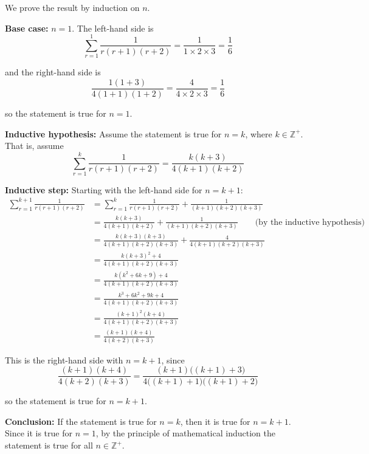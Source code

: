 \documentclass[leqno]{article}
\begin{document}
\begin{enumerate}[
  label=\textbf{\arabic*.},
  leftmargin=*,
  topsep=0pt,
  partopsep=0pt,
  parsep=0pt
]
\vspace*{10pt}

\begin{djsSolution}
We prove the result by induction on $n$.

\textbf{Base case:} $n=1$. The left-hand side is
\[
\sum_{r=1}^{1} \frac{1}{r(r+1)(r+2)}=\frac{1}{1\times 2\times 3}=\frac16
\]

and the right-hand side is
\[
\frac{1(1+3)}{4(1+1)(1+2)}
=\frac{4}{4\times 2\times 3}
=\frac16
\]

so the statement is true for $n=1$.

\textbf{Inductive hypothesis:} Assume the statement is true for $n=k$, where $k\in\mathbb{Z}^+$. That is, assume
\[
\sum_{r=1}^{k} \frac{1}{r(r+1)(r+2)}
=
\frac{k(k+3)}{4(k+1)(k+2)}
\]

\textbf{Inductive step:} Starting with the left-hand side for $n=k+1$:
\begin{align*}
\sum_{r=1}^{k+1} \frac{1}{r(r+1)(r+2)}
&=
\sum_{r=1}^{k} \frac{1}{r(r+1)(r+2)}
+\frac{1}{(k+1)(k+2)(k+3)} \\
&=
\frac{k(k+3)}{4(k+1)(k+2)}
+\frac{1}{(k+1)(k+2)(k+3)}
\qquad \text{(by the inductive hypothesis)} \\
&=
\frac{k(k+3)(k+3)}{4(k+1)(k+2)(k+3)}
+\frac{4}{4(k+1)(k+2)(k+3)} \\
&=
\frac{k(k+3)^2+4}{4(k+1)(k+2)(k+3)} \\
&=
\frac{k(k^2+6k+9)+4}{4(k+1)(k+2)(k+3)} \\
&=
\frac{k^3+6k^2+9k+4}{4(k+1)(k+2)(k+3)} \\
&=
\frac{(k+1)^2(k+4)}{4(k+1)(k+2)(k+3)} \\
&=
\frac{(k+1)(k+4)}{4(k+2)(k+3)}
\end{align*}

This is the right-hand side with $n=k+1$, since
\[
\frac{(k+1)(k+4)}{4(k+2)(k+3)}
=
\frac{(k+1)\big((k+1)+3\big)}{4\big((k+1)+1\big)\big((k+1)+2\big)}
\]

so the statement is true for $n=k+1$.

\textbf{Conclusion:} If the statement is true for $n=k$, then it is true for $n=k+1$. Since it is true for $n=1$, by the principle of mathematical induction the statement is true for all $n \in \mathbb{Z}^{+}$.
\end{djsSolution}


\newpage

\questionitem


\end{enumerate}
\end{document}

